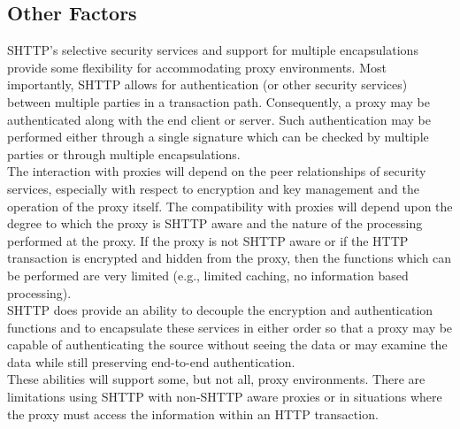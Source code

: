 \subsection{Other Factors}


  
  SHTTP's selective security services and support for multiple
  encapsulations provide some flexibility for accommodating proxy
  environments. Most importantly, SHTTP allows for authentication (or other
  security services) between multiple parties in a transaction path.
  Consequently, a proxy may be authenticated along with the end client or
  server. Such authentication may be performed either through a single
  signature which can be checked by multiple parties or through multiple
  encapsulations.\\
  
  The interaction with proxies will depend on the peer relationships of
  security services, especially with respect to encryption and key
  management and the operation of the proxy itself. The compatibility with
  proxies will depend upon the degree to which the proxy is SHTTP aware and
  the nature of the processing performed at the proxy. If the proxy is not
  SHTTP aware or if the HTTP transaction is encrypted and hidden from the
  proxy, then the functions which can be performed are very limited (e.g.,
  limited caching, no information based processing).\\
  
  SHTTP does provide an ability to decouple the encryption and
  authentication functions and to encapsulate these services in either
  order so that a proxy may be capable of authenticating the source without
  seeing the data or may examine the data while still preserving end-to-end
  authentication.\\
  
  These abilities will support some, but not all, proxy environments.
  There are limitations using SHTTP with non-SHTTP aware proxies or in
  situations where the proxy must access the information within an HTTP
  transaction.

  
